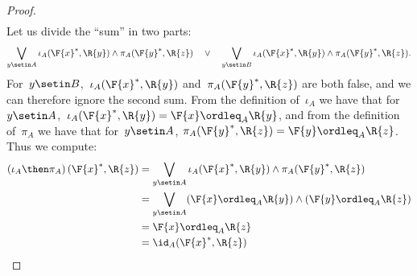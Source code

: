 \begin{proof}
\begin{equation}
\begin{aligned}
        \end{aligned}
    \end{equation}
    Let us divide the ``sum'' in two parts:
    \begin{equation}
        \bigvee_{y \setin A} \iota_A(\F{x}^*,\R{y}) \wedge \pi_A(\F{y}^*,\R{z}) \quad\vee\quad
        \bigvee_{y \setin B} \iota_A(\F{x}^*,\R{y}) \wedge \pi_A(\F{y}^*,\R{z}).
    \end{equation}
    For~$y \setin B$,~$\iota_A(\F{x}^*,\R{y})$ and~$\pi_A(\F{y}^*,\R{z})$ are both false, and we can therefore ignore the second sum.
    From the definition of~$\iota_A$ we have that for~$y\setin A$,~$ \iota_A(\F{x}^*,\R{y})=\F{x} \ordleq_A \R{y}$, and from the definition of~$\pi_A$ we have that for~$y\setin A$, $\pi_A(\F{y}^*,\R{z})=\F{y} \ordleq_A \R{z}$.
    Thus we compute:
    \begin{equation}
        \begin{aligned}
            \left(\iota_A\then \pi_A\right)(\F{x}^*, \R{z}) & = \bigvee_{y \setin A} \iota_A(\F{x}^*,\R{y}) \wedge \pi_A(\F{y}^*,\R{z}) \\
                                                            & = \bigvee_{y \setin A} (\F{x} \ordleq_A \R{y}) \wedge  (\F{y} \ordleq_A \R{z}) \\
                                                            & = \F{x} \ordleq_A \R{z} \\
                                                            & = \id_A(\F{x}^*, \R{z})
        \end{aligned}
    \end{equation}
\end{proof}

